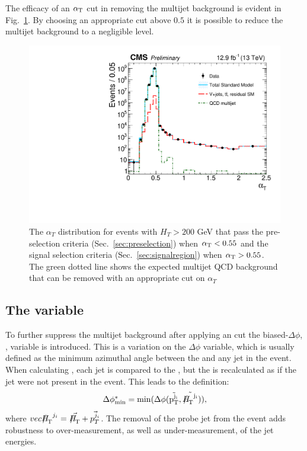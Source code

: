 The efficacy of an $\alpha_{\text{T}}$ cut in removing the \QCD multijet
background is evident in Fig.~\ref{fig:alphaT}. By
choosing an appropriate cut above $0.5$ it is possible to reduce the
multijet background to a negligible level.

\begin{figure}
	\begin{center}
		\includegraphics[width=0.7\linewidth]{figs/analysis/eventSelection/CMS-PAS-SUS-16-016_Figure-aux_001}%
	\end{center}
  \caption{The $\alpha_T$ distribution for events with $H_T>200$ GeV
  that pass the pre-selection criteria (Sec.~\ref{sec:preselection}) when
  $\alpha_{\text{T}}<0.55$ and the signal selection criteria
  (Sec.~\ref{sec:signalregion}) when
  $\alpha_{\text{T}}>0.55$. The green dotted line shows the expected multijet
  QCD background that can be removed with an appropriate cut on
  $\alpha_T$}
	\label{fig:alphaT}
\end{figure}

\subsection{The \bdphi variable}

To further suppress the \QCD multijet background after applying an
\alphat cut the biased-$\Delta\phi$, \bdphi, variable is introduced.
This is a variation on the $\Delta\phi$ variable, which is usually
defined as the minimum azimuthal angle between the \MET and any jet in
the event. When calculating \bdphi, each jet is compared to the
\MHT, but the \MHT is recalculated as if the jet were not present in
the event. This leads to the definition:
\begin{equation}
\bdphi = \rm{min}(\Delta\phi(\vec{p_T^{j_i}},\vec{\MHT^{j_i}})),
\end{equation}
where $vec{\MHT^{j_i}}=\vec{\MHT}+\vec{p_T^{j_i}}$. The removal of the
probe jet from the event adds robustness to over-measurement, as well
as under-measurement, of the jet energies.

